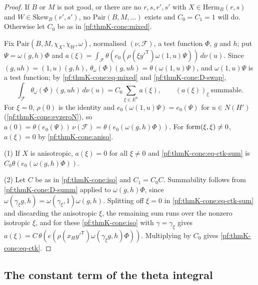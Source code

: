 \begin{proof}
If $B$ or $M$ is not good, or there are no $r,s,r',s'$ with $X\in\mathrm{Herm}_B(r,s)$ and $W\in\mathrm{Skew}_B(r',s')$, no
$\mathrm{Pair}(B,M,\dots)$ exists and $C_0=C_1=1$ will do.  Otherwise let $C_0$ be as in \cref{pf:thmK-cone:mixed}.

Fix $\mathrm{Pair}(B,M,\chi_X,\chi_W,\omega)$, normalised $(\nu,\mathcal F)$, a test function $\Phi$, $g$ and $h$; put
$\Psi=\omega(g,h)\Phi$ and
$a(\xi)=\int_{\mathcal F}\theta(e_0(\rho(\xi y'^{\mathsf T})\omega(1,u)\Psi))\,d\nu(u)$.  Since $(g,uh)=(1,u)(g,h)$,
$\theta_\omega(\Phi)(g,uh)=\theta(\omega(1,u)\Psi)$, and $\omega(1,u)\Psi$ is a test function; by
\eqref{pf:thmK-cone:eq-mixed} and \ref{pf:thmK-cone:D-swap},
\begin{equation}\label{pf:thmK-cone:eq-ctk-sum}
  \int_{\mathcal F}\theta_\omega(\Phi)(g,uh)\,d\nu(u)=C_0\sum_{\xi\in E^n}a(\xi),\qquad(a(\xi))_\xi\ \text{summable}.
\end{equation}
For $\xi=0$, $\rho(0)$ is the identity and $e_0(\omega(1,u)\Psi)=e_0(\Psi)$ for $u\in N(H')$
(\cref{pf:thmK-cone:evzeroN}), so $a(0)=\theta(e_0(\Psi))\,\nu(\mathcal F)=\theta(e_0(\omega(g,h)\Phi))$.  For
$\operatorname{form}(\xi,\xi)\neq0$, $a(\xi)=0$ by \cref{pf:thmK-cone:aniso}.

(1) If $X$ is anisotropic, $a(\xi)=0$ for all $\xi\neq0$ and \eqref{pf:thmK-cone:eq-ctk-sum} is
$C_0\theta(e_0(\omega(g,h)\Phi))$.

(2) Let $C$ be as in \cref{pf:thmK-cone:iso} and $C_1=C_0C$.  Summability follows from \ref{pf:thmK-cone:D-summ} applied
to $\omega(g,h)\Phi$, since $\omega(\gamma_\xi g,h)=\omega(\gamma_\xi,1)\omega(g,h)$.  Splitting off $\xi=0$ in
\eqref{pf:thmK-cone:eq-ctk-sum} and discarding the anisotropic $\xi$, the remaining sum runs over the nonzero isotropic
$\xi$, and for these \cref{pf:thmK-cone:iso} with $\gamma=\gamma_\xi$ gives
$a(\xi)=C\,\theta(e(\rho(x_Hy'^{\mathsf T})\omega(\gamma_\xi g,h)\Phi))$.  Multiplying by $C_0$ gives
\eqref{pf:thmK-cone:eq-ctk}.
\end{proof}

\subsection{The constant term of the theta integral}\label{pf:thmK-cone:ctint}

